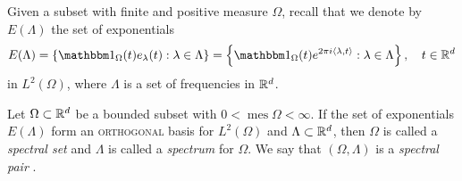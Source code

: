 \documentclass[../thesis.tex]{subfiles}
\begin{document}






Given a subset with finite and positive measure $\Omega$, recall that we denote by $E(\Lambda)$ the set of exponentials
\begin{align*}%
    E(\Lambda) = \braqMed{\indicator{\Omega}{t} e_\lambda(t) : \lambda \in \Lambda} = \braqMed{\indicator{\Omega}{t} e^{2 \pi i \braa{\lambda, t}} : \lambda \in \Lambda}, \quad t\in \R^d
\end{align*}
in $L^2(\Omega)$, where $\Lambda$ is a set of frequencies in $\mathbb{R}^d$.
\begin{definition} \label{def:spectral_set}
    Let $\Omega \subset \mathbb{R}^d$ be a bounded subset with $0< \operatorname{mes} \Omega < \infty$. If the set of exponentials $E(\Lambda)$ form an \textsc{orthogonal} basis for $L^2 (\Omega)$ and $\Lambda \subset \mathbb{R}^d$, then $\Omega$ is called a \emph{spectral set} and $\Lambda$ is called a \emph{spectrum} for $\Omega$. We say that $(\Omega, \Lambda)$ is a \emph{spectral pair} \cite{liuUniformityNonUniformGabor2003}.
\end{definition} 
\end{document}
